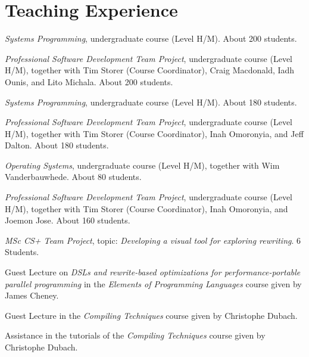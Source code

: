 \documentclass[11pt,a4paper]{moderncv}
\begin{document}
\newpage

\section{Teaching Experience}


\begin{cvitemize}[\small 2019 - 2020]
    \item \emph{Systems Programming}, undergraduate course (Level H/M). About 200 students.
    \item \emph{Professional Software Development Team Project}, undergraduate course (Level H/M), together with  Tim Storer (Course Coordinator), Craig Macdonald, Iadh Ounis, and Lito Michala. About 200 students.
\end{cvitemize}

\begin{cvitemize}[\small 2018 - 2019]
    \item \emph{Systems Programming}, undergraduate course (Level H/M). About 180 students.
    \item \emph{Professional Software Development Team Project}, undergraduate course (Level H/M), together with  Tim Storer (Course Coordinator), Inah Omoronyia, and Jeff Dalton. About 180 students.
\end{cvitemize}

\begin{cvitemize}[\small 2017 - 2018]
    \item \emph{Operating Systems}, undergraduate course (Level H/M), together with Wim Vanderbauwhede. About 80 students.
    \item \emph{Professional Software Development Team Project}, undergraduate course (Level H/M), together with  Tim Storer (Course Coordinator), Inah Omoronyia, and Joemon Jose. About 160 students.
    \item \emph{MSc CS+ Team Project}, topic: \emph{Developing a visual tool for exploring rewriting}. 6 Students.
\end{cvitemize}


\begin{cvitemize}[\small 2016 - 2017]
    \item Guest Lecture on \emph{\small DSLs and rewrite-based optimizations for performance-portable parallel programming} in the \emph{Elements of Programming Languages} course given by James Cheney.
    \item Guest Lecture in the \emph{Compiling Techniques} course given by Christophe Dubach.
    \item Assistance in the tutorials of the \emph{Compiling Techniques} course given by Christophe Dubach.
\end{cvitemize}
\end{document}
